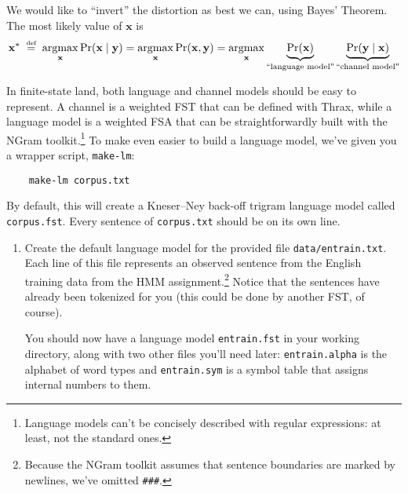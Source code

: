 \documentclass[11pt]{article}
\newcommand{\defeq}{\stackrel{\mbox{\tiny def}}{=}}
\newcommand{\argmax}{\mathop{\mathrm{argmax}}}
\newcommand{\Note}[1]{}
\newcommand{\NoteSigned}[3]{{\sethlcolor{#2}\Note{#1: #3}}}
\newcommand{\NoteJE}[1]{\NoteSigned{JE}{YellowGreen}{#1}}
\newcommand{\NoteFF}[1]{\NoteSigned{FF}{LightBlue}{#1}}
\begin{document}
\begin{enumerate}[resume]
  We would like to ``invert'' the
  distortion as best we can, using Bayes' Theorem.  The most likely
  value of $\mathbf{x}$ is
  \begin{equation}\label{eqn:channel}
    \mathbf{x}^*
    \;\defeq\; \argmax_{\mathbf{x}} \Pr(\mathbf{x} \mid \mathbf{y})
    = \argmax_{\mathbf{x}} \Pr(\mathbf{x}, \mathbf{y})
    = \argmax_{\mathbf{x}}
    \underbrace{\Pr(\mathbf{x})}_{\textrm{``language model''}}
    \underbrace{\Pr(\mathbf{y} \mid \mathbf{x})}_{\textrm{``channel model''}}
  \end{equation}

  In finite-state land, both language and channel models should be
  easy to represent.  A channel is a weighted FST that can be defined
  with Thrax, while a language model is a weighted FSA that can be
  straightforwardly built with the NGram toolkit.\footnote{Language
    models can't be concisely described with regular expressions: at
    least, not the standard ones.}  To make even easier to build a
  language model, we've given you a wrapper script, \texttt{make-lm}:

	\begin{verbatim}
	make-lm corpus.txt
	\end{verbatim}
  By default, this will create a Kneser--Ney back-off trigram language
  model called \texttt{corpus.fst}.  Every sentence of
  \texttt{corpus.txt} should be on its own line.


  \begin{enumerate}
  \item Create the default language model for the provided file
    \texttt{data/entrain.txt}.\NoteJE{why not a much bigger corpus?}
    \NoteFF{What are the options, without breaking licenses/copyright
      (e.g., LDC)?} \NoteJE{We might be able to use JHU's license to
      put LDC materials on the ugrad/grad machines, if they are
      restricted to students in the class and we explain the terms to
      the students.  Another option might be Reuters-21578, or
      something listed at Chris Manning's statnlp page.}  Each line of
    this file represents an observed sentence from the English
    training data from the HMM assignment.\footnote{Because the NGram
      toolkit assumes that sentence boundaries are marked by
      newlines, we've omitted {\tt \#\#\#}.}  Notice that the sentences
    have already been tokenized for you (this could be done by another
    FST, of course).

    You should now have a language model \texttt{entrain.fst} in your
    working directory, along with two other files you'll need later:
    \texttt{entrain.alpha} is the alphabet of word types and
    \texttt{entrain.sym} is a symbol table that assigns internal
    numbers to them.



\end{enumerate}
\end{enumerate}
\end{document}
